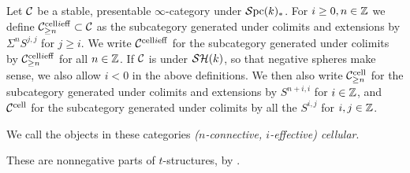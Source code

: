 \documentclass{amsart}
\numberwithin{proposition}{section}
\numberwithin{equation}{section}
\def\cell{\mathrm{cell}}
\begin{document}
\begin{definition} \label{def:cellular-categories}
Let $\mathcal C$ be a stable, presentable $\infty$-category under $\mathcal{S}\mathrm{pc}{}(k)_*$.
For $i \ge 0, n \in \mathbb{Z}$ we define $\scr C^{\cell i \eff}_{\ge n} \subset \scr C$ as the subcategory generated under colimits and extensions by $\Sigma^n S^{j,j}$ for $j \ge i$.
We write $\scr C^{\cell i \eff}$ for the subcategory generated under colimits by $\scr C^{\cell i \eff}_{\ge n}$ for all $n \in \mathbb{Z}$.
If $\mathcal C$ is under $\mathcal{SH}(k)$, so that negative spheres make sense, we also allow $i < 0$ in the above definitions.
We then also write $\scr C^{\cell}_{\ge n}$ for the subcategory generated under colimits and extensions by $S^{n+i,i}$ for $i \in \mathbb{Z}$, and $\scr C^{\cell}$ for the subcategory generated under colimits by all the $S^{i,j}$ for $i, j \in \mathbb{Z}$.

We call the objects in these categories \emph{($n$-connective, $i$-effective) cellular}.
\end{definition}

\begin{remark} \label{rmk:t-str}
These are nonnegative parts of $t$-structures, by \cite[Proposition~1.4.4.11]{lurie-ha}.
\end{remark}
\end{document}
